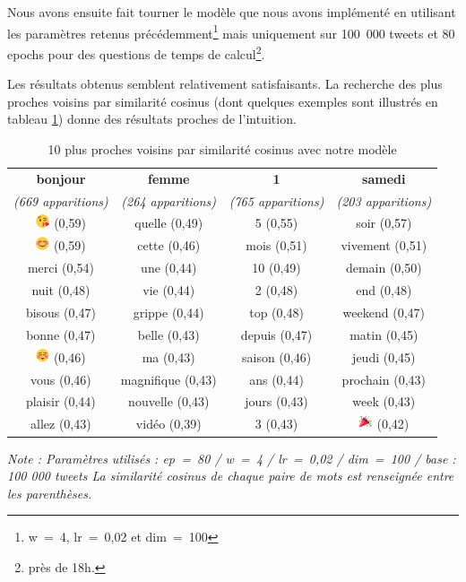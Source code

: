 \documentclass[11pt,french,french]{article}
\let\rmarkdownfootnote\footnote%
\def\footnote{\protect\rmarkdownfootnote}
\begin{document}
Nous avons ensuite fait tourner le modèle que nous avons implémenté en utilisant les paramètres retenus précédemment\footnote{w~=~4, lr~=~0,02 et dim~=~100} mais uniquement sur 100~000 tweets et 80 epochs pour des questions de temps de calcul\footnote{près de 18h.}.

Les résultats obtenus semblent relativement satisfaisants. La recherche des plus proches voisins par similarité cosinus (dont quelques exemples sont illustrés en tableau \ref{table:knn_ark}) donne des résultats proches de l'intuition.

\begin{table}
\begin{center}
\begin{tabular}{|c|c|c|c|}
    \hline
\textbf{bonjour} & \textbf{femme} & \textbf{1} & \textbf{samedi} \tabularnewline
\emph{(669 apparitions)} & \emph{(264 apparitions)} & \emph{(765 apparitions)} & \emph{(203 apparitions)} \tabularnewline
       \hline
\includegraphics[height=4mm]{img/emojis/1.png} (0,59) & quelle (0,49) & 5 (0,55) & soir (0,57) \tabularnewline
\includegraphics[height=4mm]{img/emojis/2.png} (0,59) & cette (0,46) & mois (0,51) & vivement (0,51) \tabularnewline
merci (0,54) & une (0,44) & 10 (0,49) & demain (0,50) \tabularnewline
nuit (0,48) & vie (0,44) & 2 (0,48) & end (0,48) \tabularnewline
bisous (0,47) & grippe (0,44) & top (0,48) & weekend (0,47) \tabularnewline
bonne (0,47) & belle (0,43) & depuis (0,47) & matin (0,45) \tabularnewline
\includegraphics[height=4mm]{img/emojis/3.png} (0,46) & ma (0,43) & saison (0,46) & jeudi (0,45) \tabularnewline
vous (0,46) & magnifique (0,43) & ans (0,44) & prochain (0,43) \tabularnewline
plaisir (0,44) & nouvelle (0,43) & jours (0,43) & week (0,43) \tabularnewline
allez (0,43) & vidéo (0,39) & 3 (0,43) & \includegraphics[height=4mm]{img/emojis/4.png} (0,42) \tabularnewline
    \hline
 \end{tabular}
\captionsetup{margin=0cm,format=hang,justification=justified}
\caption{10 plus proches voisins par similarité cosinus avec \og notre \fg{} modèle}\label{table:knn_ark}
\end{center}
\vspace{-0.3cm}
\footnotesize
\emph{Note : Paramètres utilisés : ep = 80 / w = 4 / lr = 0,02 / dim = 100 / base : 100 000 tweets\newline
La similarité cosinus de chaque paire de mots est renseignée entre les parenthèses.}

\end{table}
\end{document}
